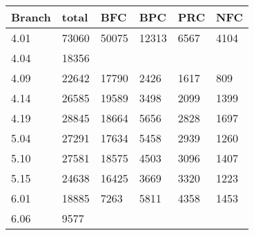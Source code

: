\begin{tabular}{llllll}
Branch & total & BFC & BPC & PRC & NFC \\ \hline
4.01 & 73060 & 50075 & 12313 & 6567 & 4104 \\
4.04 & 18356 \\
4.09 & 22642 & 17790 & 2426 & 1617 & 809 \\
4.14 & 26585 & 19589 & 3498 & 2099 & 1399 \\
4.19 & 28845 & 18664 & 5656 & 2828 & 1697 \\
5.04 & 27291 & 17634 & 5458 & 2939 & 1260 \\
5.10 & 27581 & 18575 & 4503 & 3096 & 1407 \\
5.15 & 24638 & 16425 & 3669 & 3320 & 1223 \\
6.01 & 18885 & 7263 & 5811 & 4358 & 1453 \\
6.06 & 9577 \\
\end{tabular}
